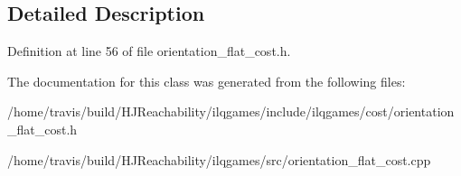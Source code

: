 \subsection{Detailed Description}


Definition at line 56 of file orientation\+\_\+flat\+\_\+cost.\+h.



The documentation for this class was generated from the following files\+:\begin{DoxyCompactItemize}
\item 
/home/travis/build/\+H\+J\+Reachability/ilqgames/include/ilqgames/cost/orientation\+\_\+flat\+\_\+cost.\+h\item 
/home/travis/build/\+H\+J\+Reachability/ilqgames/src/orientation\+\_\+flat\+\_\+cost.\+cpp\end{DoxyCompactItemize}
